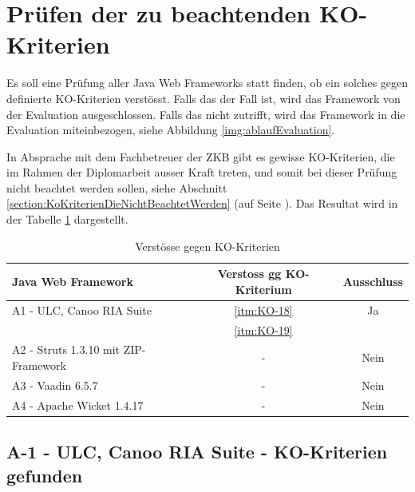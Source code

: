   \section{Prüfen der zu beachtenden KO-Kriterien}
  
  Es soll eine Prüfung aller Java Web Frameworks statt finden, ob ein solches
  gegen definierte KO-Kriterien verstösst. Falls das der Fall ist, wird das
  Framework von der Evaluation ausgeschlossen. Falls das nicht zutrifft, wird
  das Framework in die Evaluation miteinbezogen, siehe Abbildung
  \ref{img:ablaufEvaluation}.
  
  In Absprache mit dem Fachbetreuer der \ac{ZKB} gibt es gewisse KO-Kriterien,
  die im Rahmen der Diplomarbeit ausser Kraft treten, und somit bei dieser
  Prüfung nicht beachtet werden sollen, siehe Abschnitt
  \ref{section:KoKriterienDieNichtBeachtetWerden}
   (auf Seite
  \pageref{section:KoKriterienDieNichtBeachtetWerden}). Das Resultat wird in
  der Tabelle \ref{tab:gefundeneKOKriterien} dargestellt.
  \newline
  
  \begin{table}[!h]
    \sffamily 
    \begin{center}
      \begin{tabular}{lcc}
        \toprule
        \textbf{Java Web Framework} & \textbf{Verstoss gg KO-Kriterium} &
        \textbf{Ausschluss}\\
        \midrule
        A1 - ULC, Canoo RIA Suite & \ref{itm:KO-18} & Ja\\
        & \ref{itm:KO-19} &\\
        A2 - Struts 1.3.10 mit ZIP-Framework & - & Nein\\
        A3 - Vaadin 6.5.7 & - & Nein\\
        A4 - Apache Wicket 1.4.17 & - & Nein\\
        \bottomrule
      \end{tabular}
      \caption{Verstösse gegen KO-Kriterien}
      \label{tab:gefundeneKOKriterien}
    \end{center}
  \end{table}

  \subsection{A-1 - ULC, Canoo RIA Suite - KO-Kriterien gefunden}
  
